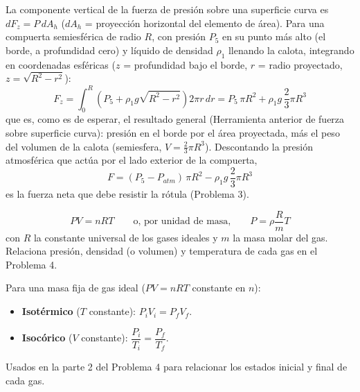\documentclass[12pt]{article}
\begin{document}

La componente vertical de la fuerza de presi\'on sobre una superficie curva es
$dF_z=P\,dA_h$ ($dA_h$ = proyecci\'on horizontal del elemento de \'area). Para una
compuerta semiesf\'erica de radio $R$, con presi\'on $P_5$ en su punto m\'as alto
(el borde, a profundidad cero) y l\'iquido de densidad $\rho_1$ llenando la calota,
integrando en coordenadas esf\'ericas ($z$ = profundidad bajo el borde, $r$ = radio
proyectado, $z=\sqrt{R^2-r^2}$):
\[
F_z=\int_0^R \left(P_5+\rho_1 g\sqrt{R^2-r^2}\right)2\pi r\,dr
= P_5\,\pi R^2+\rho_1 g\,\frac{2}{3}\pi R^3
\]
que es, como es de esperar, el resultado general (Herramienta anterior de fuerza sobre
superficie curva): presi\'on en el borde por el \'area proyectada, m\'as el peso del
volumen de la calota (semiesfera, $V=\frac23\pi R^3$). Descontando la presi\'on
atmosf\'erica que act\'ua por el lado exterior de la compuerta,
\[
\boxed{F=(P_5-P_{atm})\,\pi R^2-\rho_1 g\,\frac{2}{3}\pi R^3}
\]
es la fuerza neta que debe resistir la r\'otula (Problema 3).


\[
\boxed{PV=nRT}
\qquad\text{o, por unidad de masa,}\qquad
\boxed{P=\rho\frac{R}{m}T}
\]
con $R$ la constante universal de los gases ideales y $m$ la masa molar del gas.
Relaciona presi\'on, densidad (o volumen) y temperatura de cada gas en el Problema 4.


Para una masa fija de gas ideal ($PV=nRT$ constante en $n$):
\begin{itemize}
\item \textbf{Isot\'ermico} ($T$ constante): $\boxed{P_iV_i=P_fV_f}$.
\item \textbf{Isoc\'orico} ($V$ constante): $\boxed{\dfrac{P_i}{T_i}=\dfrac{P_f}{T_f}}$.
\end{itemize}
Usados en la parte 2 del Problema 4 para relacionar los estados inicial y final de
cada gas.

\end{document}
